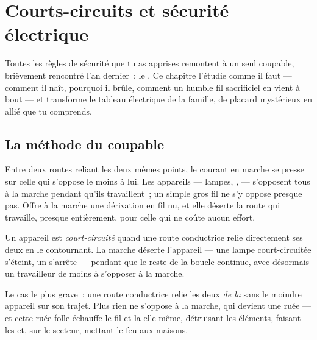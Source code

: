 \chapter{Courts-circuits et sécurité électrique}\label{ch:g7:short-circuits-safety}

Toutes les règles de sécurité que tu as apprises remontent à un seul
coupable, brièvement rencontré l'an dernier~: le . Ce
chapitre l'étudie comme il faut --- comment il naît, pourquoi il
brûle, comment un humble fil sacrificiel en vient à bout --- et
transforme le tableau électrique de la famille, de placard mystérieux
en allié que tu comprends.

\section{La méthode du coupable}

\begin{proposition}\label{prop:g7:short-circuits-safety:effortless}
Entre deux routes reliant les deux mêmes points, le courant en marche
se presse sur celle qui s'oppose le moins à lui. Les appareils ---
lampes, ,  --- s'opposent tous à la marche pendant
qu'ils travaillent~; un simple gros fil ne s'y oppose presque pas.
Offre à la marche une dérivation en fil nu, et elle déserte la route
qui travaille, presque entièrement, pour celle qui ne coûte aucun
effort.
\end{proposition}

\begin{definition}\label{def:g7:short-circuits-safety:device}
Un appareil est \emph{court-circuité} quand une
route conductrice relie directement ses deux  en le
contournant. La marche déserte l'appareil --- une lampe
court-circuitée s'éteint, un  s'arrête --- pendant que le reste
de la boucle continue, avec désormais un travailleur de moins à
s'opposer à la marche.
\end{definition}

\begin{definition}\label{def:g7:short-circuits-safety:battery}
Le cas le plus grave~: une route conductrice relie les deux 
\emph{de la } sans le moindre appareil sur son trajet. Plus rien
ne s'oppose à la marche, qui devient une ruée --- et cette ruée
folle échauffe le fil et la  elle-même, détruisant les
éléments, faisant  les  et, sur le secteur, mettant le
feu aux maisons.
\end{definition}

